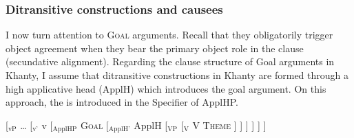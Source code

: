 \documentclass[output=paper
,modfonts
,nonflat]{langsci/langscibook}
\begin{document}
\subsubsection{Ditransitive constructions and causees}

I now turn attention to \textsc{Goal} arguments. Recall that they obligatorily trigger object agreement when they bear the primary object role in the clause (secundative alignment). 
Regarding the clause structure of Goal arguments in Khanty, I assume that ditransitive constructions in Khanty are formed through a high applicative head (ApplH) \citep{pylkkanen2008} which introduces the goal argument.
On this approach, the \goal {} is introduced in the Specifier of ApplHP. 


\begin{exe}
\ex \label{tree:highappl}
 { [$_{\textrm{vP}}$ {\ldots} [$_{\textrm{v'}}$ v [$_{\textrm{ApplHP}}$ \textsc{Goal} [$_{\textrm{ApplH'}}$ ApplH [$_{\textrm{VP}}$ {} [$_{\textrm{V}}$ V \textsc{Theme}  ] ] ] ] ] ]}

\end{exe}
\end{document}
